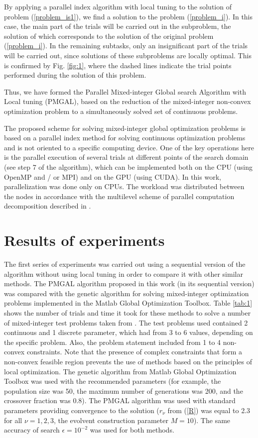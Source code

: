 \documentclass[
11pt,%
tightenlines,%
twoside,%
onecolumn,%
nofloats,%
nobibnotes,%
nofootinbib,%
superscriptaddress,%
noshowpacs,%
centertags]%
{revtex4}
\begin{document}
By applying a parallel index algorithm with local tuning to the solution of problem  (\ref{problem_is1}), we find a solution to the problem  (\ref{problem_i}). In this case, the main part of the trials will be carried out in the subproblem, the solution of which corresponds to the solution of the original problem (\ref{problem_i}). In the remaining subtasks, only an insignificant part of the trials will be carried out, since solutions of these subproblems are locally optimal. This is confirmed by Fig. \ref{fig:1}, where the dashed lines indicate the trial points performed during the solution of this problem.

Thus, we have formed the Parallel Mixed-integer Global search Algorithm with Local tuning (PMGAL), based on the reduction of the mixed-integer non-convex optimization problem to a simultaneously solved set of continuous problems.

The proposed scheme for solving mixed-integer global optimization problems is based on a parallel index method for solving continuous optimization problems and is not oriented to a specific computing device.  One of the key operations here is the parallel execution of several trials at different points of the search domain (see step 7 of the algorithm), which can be implemented both on the CPU (using OpenMP and / or MPI) and on the GPU (using CUDA).
In this work, parallelization was done only on CPUs. The workload was distributed between the nodes in accordance with the multilevel scheme of parallel computation decomposition described in \cite{Strongin2018,Barkalov2020}.

\section{Results of experiments}

The first series of experiments was carried out using a sequential version of the algorithm without using local tuning in order to compare it with other similar methods.
The PMGAL algorithm proposed in this work (in its sequential version) was compared with the genetic algorithm for solving mixed-integer optimization problems implemented in the Matlab Global Optimization Toolbox. Table \ref{tab:1} shows the number of trials and time it took for these methods to solve a number of mixed-integer test problems taken from \cite{Deep,Floudas}.
The test problems used contained 2 continuous and 1 discrete parameter, which had from 3 to 6 values, depending on the specific problem.
Also, the problem statement included from 1 to 4 non-convex constraints.
Note that the presence of complex constraints that form a non-convex feasible region prevents the use of methods based on the principles of local optimization.
The genetic algorithm from Matlab Global Optimization Toolbox was used with the recommended parameters (for example, the population size was 50, the maximum number of generations was 200, and the crossover fraction was 0.8). The PMGAL algorithm was used with standard parameters providing convergence to the solution ($r_\nu$ from (\ref{R}) was equal to 2.3 for all $\nu = 1,2,3$, the evolvent construction parameter $M=10$).
The same accuracy of search $\epsilon = 10^{-2}$ was used for both methods.
\end{document}
